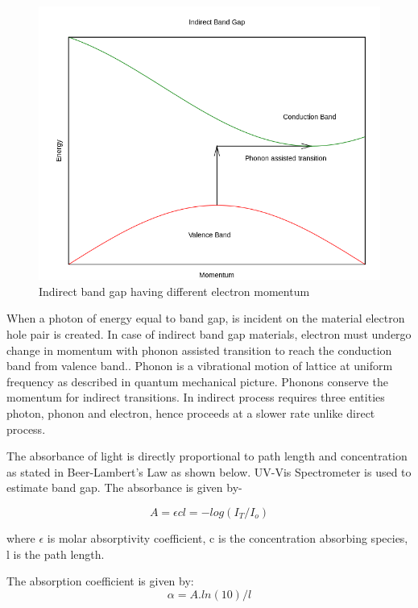 \documentclass[a4paper, amsfonts, amssymb, amsmath, reprint, showkeys, nofootinbib, twoside]{revtex4-1}
\begin{document}
\begin{figure}[H]
	\centering
	\includegraphics[scale=0.3]{2}
	\caption{Indirect band gap having different electron momentum}
	\label{2}
\end{figure}

When a photon of energy equal to band gap, is incident on the material electron hole pair is created. In case of indirect band gap materials, electron must undergo change in momentum with phonon assisted transition to reach the conduction band from valence band.. Phonon is a vibrational motion of lattice at uniform frequency as described in quantum mechanical picture. Phonons conserve the momentum for indirect transitions. In indirect process requires three entities photon, phonon and electron, hence proceeds at a slower rate unlike direct process.

The absorbance of light is directly proportional to path length and concentration as stated in Beer-Lambert's Law as shown below. UV-Vis Spectrometer is used to estimate band gap. The absorbance is given by-

\begin{equation}
	A=\epsilon c l = -log(I_T/I_o)
\end{equation}

where $\epsilon$ is molar absorptivity coefficient, c is the concentration absorbing species, l is the path length.

The absorption coefficient is given by:
\begin{equation}
	\alpha=A.ln(10)/l
\end{equation}
\end{document}
